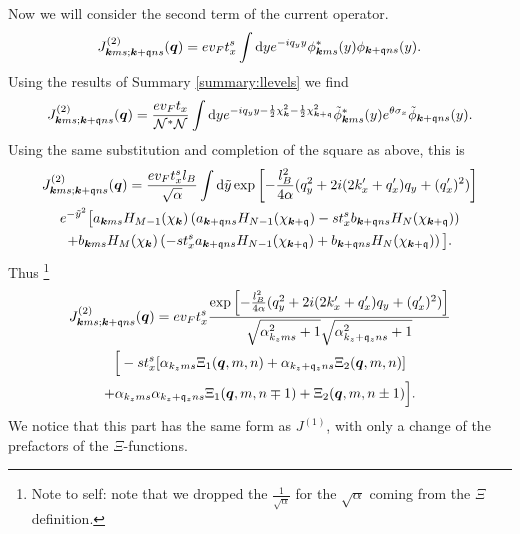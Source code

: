 Now we will consider the second term of the current operator.
\begin{equation}
  \label{eq:83}
  J_{\bm{k} m s; \bm{k} + \mathfrak{q} n s}^{(2)} (\bm{q}) =
  e v_{F} t^s_{x}
  \int \mathrm{d} y
  e^{-iq_{y} y}
  \phi ^{*}_{\bm{k} m s}(y)  \phi _{\bm{k} + \mathfrak{q} n s}(y).
\end{equation}
Using the results of Summary \ref{summary:llevels} we find
\begin{equation}
  \label{eq:84}
  J_{\bm{k} m s; \bm{k} + \mathfrak{q} n s}^{(2)} (\bm{q}) =
  \frac{e v_F t_x }{\mathcal{N}^{*} \mathcal{N}}
  \int \mathrm{d} y
  e^{-i q_{y} y - \frac{1}{2} \chi_{\bm{k}} ^2 - \frac{1}{2} \chi _{\bm{k} + \mathfrak{q}}^2}
  \tilde{\phi} ^{*}_{\bm{k} m s}(y) e^{\theta \sigma _{x}} \tilde{\phi} _{\bm{k} + \mathfrak{q} n s}(y).
\end{equation}
Using the same substitution and completion of the square as above, this is
\begin{multline}
  \label{eq:85}
  J_{\bm{k} m s; \bm{k} + \mathfrak{q} n s}^{(2)} (\bm{q}) =
  \frac{e v_F t^s_x l_{B}}{\sqrt{\alpha}}
  \int \mathrm{d} \tilde{y}
    \exp \left[
      -\frac{l_{B}^2}{4 \alpha } (q_{y}^2 + 2i (2 k'_x + q' _x) q_{y}  + (q'_x)^2 )
    \right]\\
  e^{-\tilde{y}^2} \big[
    a_{\bm{k} m s} H_{M-1}( \chi _{\bm{k}} ) \left(a_{\bm{k} + \mathfrak{q} n s} H_{N-1}( \chi _{\bm{k} + \mathfrak{q}} ) - s t^s_{x} b_{\bm{k} + \mathfrak{q} n s} H_{N}( \chi _{\bm{k} + \mathfrak{q}} ) \right)\\
   +
    b_{\bm{k} m s} H_{M}( \chi _{\bm{k}} ) \left(- s t^s_{x} a_{\bm{k} + \mathfrak{q} n s} H_{N-1}( \chi _{\bm{k} + \mathfrak{q}} ) + b_{\bm{k} + \mathfrak{q} n s} H_{N}( \chi _{\bm{k} + \mathfrak{q}} ) \right)
    \big].
\end{multline}
Thus
\footnote{Note to self: note that we dropped the \( \frac{1}{\sqrt{\alpha } } \) for the \( \sqrt{\alpha }  \) coming from the \( \Xi  \) definition.}
\begin{multline}
  J_{\bm{k} m s; \bm{k} + \mathfrak{q} n s}^{(2)} (\bm{q}) =
  e v_F t^s_x
  \frac{
    \exp \left[
      -\frac{l_{B}^2}{4 \alpha } (q_{y}^2 + 2i (2 k' _x + q' _x) q_{y} + (q'_x)^2 )
    \right]
  }{
    \sqrt{\alpha_{k_z m s}^2 + 1} \sqrt{\alpha_{k_z + \mathfrak{q}_z n s}^2 + 1}
  }\\
  \Big[
  -s t^s_x [ \alpha_{k_z m s} \Xi_1(\bm{q}, m, n) + \alpha_{k_z + \mathfrak{q}_z n s} \Xi_2(\bm{q}, m, n) ]\\
  + \alpha_{k_z m s} \alpha_{k_z + \mathfrak{q}_z ns} \Xi_1(\bm{q}, m, n\mp 1)
  + \Xi_2(\bm{q}, m, n \pm 1) \Big].
\end{multline}
We notice that this part has the same form as \( J^{(1)} \), with only a change of the prefactors of the \( \Xi  \)-functions.

